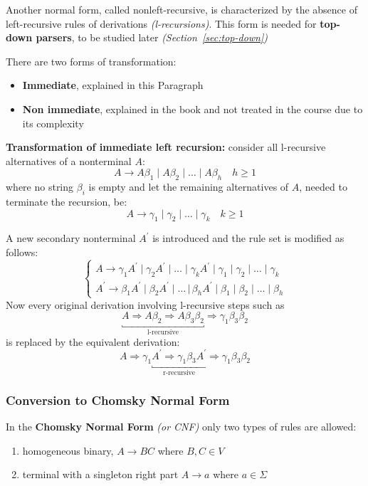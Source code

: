 \documentclass[english]{article}
\begin{document}
Another normal form, called nonleft-recursive, is characterized by the absence of left-recursive rules of derivations \textit{(l-recursions)}.
This form is needed for \textbf{top-down parsers}, to be studied later \textit{(Section~\ref{sec:top-down})}

There are two forms of transformation:
\begin{itemize}
  \item \textbf{Immediate}, explained in this Paragraph
  \item \textbf{Non immediate}, explained in the book and not treated in the course due to its complexity
\end{itemize}

\bigskip
\textbf{Transformation of immediate left recursion:}
consider all l-recursive alternatives of a nonterminal \(A\):
\[ A \rightarrow A \beta_1 \mid A \beta_2 \mid \ldots \mid A \beta_h \quad h \geq 1 \]
where no string \(\beta_i\) is empty and let the remaining alternatives of \(A\), needed to terminate the recursion, be:
\[ A \rightarrow \gamma_1 \mid \gamma_2 \mid \ldots \mid \gamma_k \quad k \geq 1 \]

A new secondary nonterminal \(A^\prime\) is introduced and the rule set is modified as follows:
\[\begin{cases}
    A \rightarrow \gamma_1 A^\prime \mid \gamma_2 A^\prime \mid \ldots \mid \gamma_k A^\prime \mid \gamma_1 \mid \gamma_2 \mid \ldots \mid \gamma_k \\
    A^\prime \rightarrow \beta_1 A^\prime \mid \beta_2 A^\prime \mid \ldots \, |\, \beta_h A^\prime \mid \beta_1 \mid \beta_2 \mid \ldots \mid \beta_h
  \end{cases}\]
Now every original derivation involving l-recursive steps such as
\[\underbracket{A \Rightarrow A \beta_2 \Rightarrow A \beta_3 \beta_2}_{\text{l-recursive}} \Rightarrow \gamma_1 \beta_3 \beta_2 \]
is replaced by the equivalent derivation:
\[A \Rightarrow \gamma_1 \underbracket{A^\prime \Rightarrow \gamma_1 \beta_3 A^\prime}_{\text{r-recursive}} \Rightarrow \gamma_1 \beta_3 \beta_2 \]

\subsubsection{Conversion to Chomsky Normal Form}
\label{sec:conversion-to-chomsky-normal-form}

In the \textbf{Chomsky Normal Form} \textit{(or CNF)} only two types of rules are allowed:

\begin{enumerate}
  \item homogeneous binary, \(A \rightarrow BC\) where \(B, C \in V\)
  \item terminal with a singleton right part \(A \rightarrow a\) where \(a \in \Sigma\)
\end{enumerate}
\end{document}
